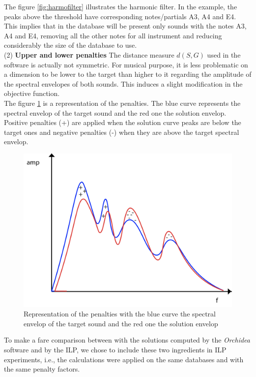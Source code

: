 \documentclass[a4paper]{book}
\begin{document}
The figure \ref{fig:harmofilter} illustrates the harmonic filter. In the example, the peaks above the threshold have corresponding notes/partials A3, A4 and E4. This implies that in the database will be present only sounds with the notes A3, A4 and E4, removing all the other notes for all instrument and reducing considerably the size of the database to use. \\


(2) \textbf{Upper and lower penalties} The distance measure $d(S,G)$ used in the software is actually not symmetric. For musical purpose, it is less problematic on a dimension to be lower to the target than higher to it regarding the amplitude of the spectral envelopes of both sounds. This induces a slight modification in the objective function.\\

The figure \ref{fig:penalt} is a representation of the penalties. The blue curve represents the spectral envelop of the target sound and the red one the solution envelop. Positive penalties (+) are applied when the solution curve peaks are below the target ones and negative penalties (-) when they are above the target spectral envelop. 

\begin{figure}[h!]
    \centering
    \includegraphics[scale=0.3]{penalt.png}
    \caption{Representation of the penalties with the blue curve the spectral envelop of the target sound and the red one the solution envelop}
    \label{fig:penalt}
\end{figure}

To make a fare comparison between with the solutions computed by the \textit{Orchidea} software and by the ILP, we chose to include these two ingredients in  ILP experiments, i.e., the calculations were applied on the same databases and with the same penalty factors.
\end{document}
